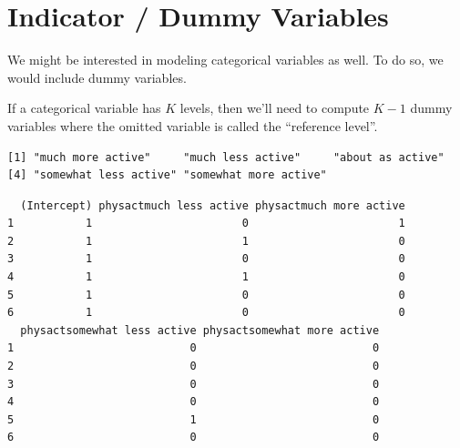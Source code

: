 \documentclass[
  letterpaper,
  DIV=11,
  numbers=noendperiod]{scrreport}
\newenvironment{Shaded}{\begin{snugshade}}{\end{snugshade}}
\newcommand{\AttributeTok}[1]{\textcolor[rgb]{0.40,0.45,0.13}{#1}}
\newcommand{\CommentTok}[1]{\textcolor[rgb]{0.37,0.37,0.37}{#1}}
\newcommand{\FunctionTok}[1]{\textcolor[rgb]{0.28,0.35,0.67}{#1}}
\newcommand{\NormalTok}[1]{\textcolor[rgb]{0.00,0.23,0.31}{#1}}
\newcommand{\OtherTok}[1]{\textcolor[rgb]{0.00,0.23,0.31}{#1}}
\newcommand{\SpecialCharTok}[1]{\textcolor[rgb]{0.37,0.37,0.37}{#1}}
\begin{document}
\hypertarget{indicator-dummy-variables}{%
\section{Indicator / Dummy Variables}\label{indicator-dummy-variables}}

We might be interested in modeling categorical variables as well. To do
so, we would include dummy variables.

If a categorical variable has \(K\) levels, then we'll need to compute
\(K-1\) dummy variables where the omitted variable is called the
``reference level''.

\begin{Shaded}
\end{Shaded}

\begin{verbatim}
[1] "much more active"     "much less active"     "about as active"     
[4] "somewhat less active" "somewhat more active"
\end{verbatim}

\begin{Shaded}
\end{Shaded}

\begin{verbatim}
  (Intercept) physactmuch less active physactmuch more active
1           1                       0                       1
2           1                       1                       0
3           1                       0                       0
4           1                       1                       0
5           1                       0                       0
6           1                       0                       0
  physactsomewhat less active physactsomewhat more active
1                           0                           0
2                           0                           0
3                           0                           0
4                           0                           0
5                           1                           0
6                           0                           0
\end{verbatim}
\end{document}
